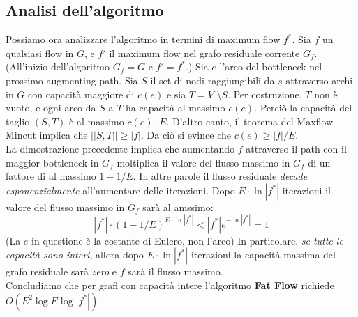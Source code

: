 \subsection{Analisi dell'algoritmo}

Possiamo ora analizzare l'algoritmo in termini di maximum flow $f^{*}$. Sia $f$ un qualsiasi flow in $G$, e $f'$ il maximum flow nel grafo residuale corrente $G_f$. (All'inizio dell'algoritmo $G_f = G$ e $f' = f^{*}$.)
Sia $e$ l'arco del bottleneck nel prossimo augmenting path. Sia $S$ il set di nodi raggiungibili da $s$ attraverso archi in $G$ con capacità maggiore di $c(e)$ e sia $T = V$ \textbackslash $S$. Per costruzione, $T$ non è vuoto, e ogni arco da $S$ a $T$ ha capacità al massimo $c(e)$. Perciò la capacità del taglio $(S,T)$ è al massimo $c(e) \cdot E$. D'altro canto, il teorema del Maxflow-Mincut implica che $||S,T|| \geq |f|$. Da ciò si evince che $c(e) \geq |f|/E$.\\

La dimostrazione precedente implica che aumentando $f$ attraverso il path con il maggior bottleneck in $G_f$ moltiplica il valore del flusso massimo in $G_f$ di un fattore di al massimo $1 - 1/E$. In altre parole il flusso residuale \textit{decade esponenzialmente} all'aumentare delle iterazioni. Dopo $E \cdot \ln{|f^{*}|}$ iterazioni il valore del flusso massimo in $G_f$ sarà al amssimo:
$$
|f^{*}|\cdot(1-1/E)^{E\cdot \ln{|f^{*}|}} < |f^{*}|e^{-\ln{|f^{*}|}} = 1
$$
(La $e$ in questione è la costante di Eulero, non l'arco) In particolare, \textit{se tutte le capacità sono interi}, allora dopo $E\cdot \ln{|f^{*}|}$ iterazioni la capacità massima del grafo residuale sarà \textit{zero} e $f$ sarà il flusso massimo.\\

Concludiamo che per grafi con capacità intere l'algoritmo \textbf{Fat Flow} richiede $O(E^2\log{E}\log{|f^{*}|})$.
